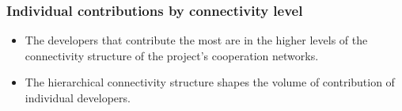 \documentclass[ignorenonframetext,red,8pt,notes=hide]{beamer}
\begin{document}
\begin{frame}
\frametitle{Individual contributions by connectivity level}

\begin{itemize}
\item The developers that contribute the most are in the higher levels of the connectivity structure of the project's cooperation networks.

\item The hierarchical connectivity structure shapes the volume of contribution of individual developers.

\end{itemize}

\begin{figure}
\vspace{-0.6cm}
\centering
{}
\hspace{0.02cm}
\end{figure}
\end{frame}
\end{document}
